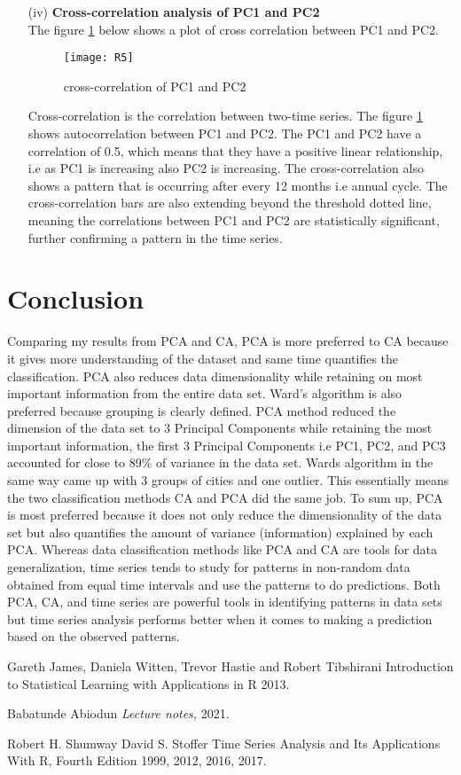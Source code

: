 \documentclass[12pt,a4paper]{article}
\begin{document}
\begin{enumerate}
\item[(iv)]\textbf{Cross-correlation  analysis of PC1 and PC2}\\
The figure \ref{fig 20} below shows a plot of cross correlation between PC1 and PC2.
\begin{figure}[H]
\texttt{[image: R5]}
\centering
\caption{cross-correlation of  PC1 and PC2}
\label{fig 20}
\end{figure}
Cross-correlation is the correlation between two-time series. The figure \ref{fig 20} shows autocorrelation between PC1 and PC2. The PC1 and PC2 have a correlation of 0.5, which means that they have a positive linear relationship, i.e as PC1 is increasing also PC2 is increasing. The cross-correlation also shows a pattern that is occurring after every 12 months i.e annual cycle. The cross-correlation bars are also extending beyond the threshold dotted line, meaning the correlations between PC1 and PC2 are statistically significant, further confirming a pattern in the time series. 
\end{enumerate}
\section{Conclusion}

Comparing my results from PCA and CA, PCA is more preferred to CA because it gives more understanding of the dataset and same time quantifies the classification. PCA also reduces data dimensionality while retaining on most important information from the entire data set.
Ward's algorithm is also preferred because grouping is clearly defined. PCA method reduced the dimension of the data set to 3 Principal Components while retaining the most important information, the first 3 Principal Components i.e PC1, PC2, and PC3 accounted for close to 89\% of variance in the data set. Wards algorithm in the same way came up with 3 groups of cities and one outlier. This essentially means the two classification methods CA and PCA did the same job. To sum up, PCA is most preferred because it does not only reduce the dimensionality of the data set but also quantifies the amount of variance (information) explained by each PCA. Whereas data classification methods like PCA and CA are tools for data generalization, time series tends to study for patterns in non-random data obtained from equal time intervals and use the patterns to do predictions. Both PCA, CA, and time series are powerful tools in identifying patterns in data sets but time series analysis performs better when it comes to making a prediction based on the observed patterns.
\newpage
{\color {red} \begin{thebibliography}{99}

   Gareth James, Daniela Witten, Trevor Hastie and Robert Tibshirani { Introduction to Statistical Learning with Applications in R}  2013.
  
   Babatunde Abiodun {\em Lecture notes,}  2021.
 
   Robert H. Shumway
David S. Stoffer {Time Series Analysis
and Its Applications
With R, Fourth Edition}  1999, 2012, 2016, 2017.
\end{thebibliography}}
\end{document}
